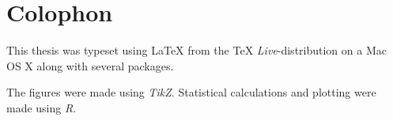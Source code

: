 \chapter*{Colophon}
\label{chapter:colophon}

This thesis was typeset using \LaTeX{} from the \TeX{}
\textit{Live}-distribution on a Mac OS X along with several packages.

The figures were made using \textit{TikZ}.
Statistical calculations and plotting were made using \textit{R}.
